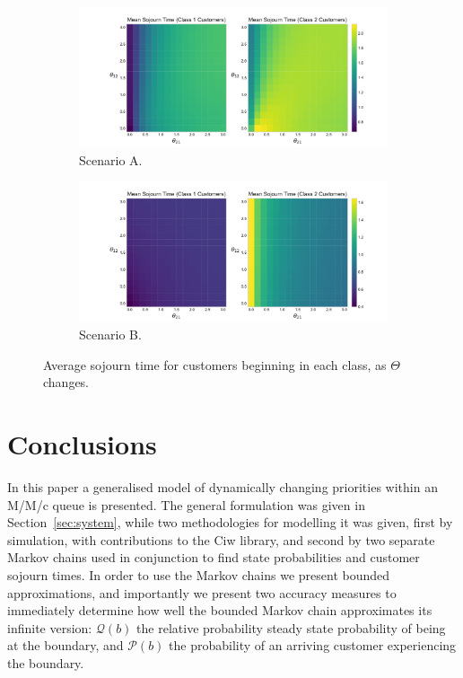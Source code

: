 \documentclass{article}
\begin{document}
\begin{figure}
  \begin{center}
  \begin{subfigure}[b]{0.49\textwidth}
    \includegraphics[width=\textwidth]{img/vary_thetas_sojourn_scen1.pdf}
    \caption{Scenario A.}
    \label{fig:sojourn_A}
  \end{subfigure}
  \begin{subfigure}[b]{0.49\textwidth}
    \includegraphics[width=\textwidth]{img/vary_thetas_sojourn_scen2.pdf}
    \caption{Scenario B.}
    \label{fig:sojourn_B}
  \end{subfigure}
  \caption{Average sojourn time for customers beginning in each class, as
  $\Theta$ changes.}
  \end{center}
\end{figure}


\section{Conclusions}
In this paper a generalised model of dynamically changing priorities within an
M/M/c queue is presented. The general formulation was given in
Section~\ref{sec:system}, while two methodologies for modelling it was given,
first by simulation, with contributions to the Ciw library, and second by two
separate Markov chains used in conjunction to find state probabilities and
customer sojourn times. In order to use the Markov chains we present bounded
approximations, and importantly we present two accuracy measures to immediately
determine how well the bounded Markov chain approximates its infinite version:
$\mathcal{Q}(b)$ the relative probability steady state probability of being at
the boundary, and $\mathcal{P}(b)$ the probability of an arriving customer
experiencing the boundary.
\end{document}
